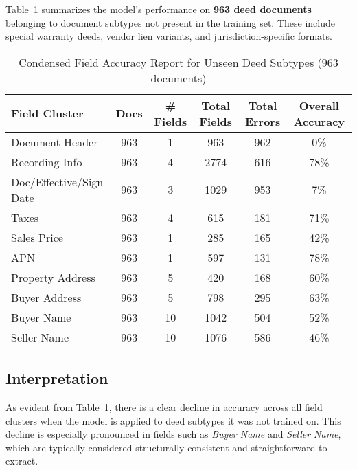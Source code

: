 \documentclass{article}
\begin{document}
Table~\ref{tab:out_of_domain_accuracy} summarizes the model’s performance on \textbf{963 deed documents} belonging to document subtypes not present in the training set. These include special warranty deeds, vendor lien variants, and jurisdiction-specific formats.

\vspace{2mm}

\begin{table}[H]
\centering
\footnotesize
\renewcommand{\arraystretch}{1.2}
\begin{tabular}{|l|c|c|c|c|c|}
\hline
\textbf{Field Cluster} & \textbf{Docs} & \textbf{\# Fields} & \textbf{Total Fields} & \textbf{Total Errors} & \textbf{Overall Accuracy} \\
\hline
Document Header             & 963 & 1  & 963  & 962  & 0\% \\
Recording Info              & 963 & 4  & 2774 & 616  & 78\% \\
Doc/Effective/Sign Date     & 963 & 3  & 1029 & 953  & 7\% \\
Taxes                       & 963 & 4  & 615  & 181  & 71\% \\
Sales Price                 & 963 & 1  & 285  & 165  & 42\% \\
APN                         & 963 & 1  & 597  & 131  & 78\% \\
Property Address            & 963 & 5  & 420  & 168  & 60\% \\
Buyer Address               & 963 & 5  & 798  & 295  & 63\% \\
Buyer Name                  & 963 & 10 & 1042 & 504  & 52\% \\
Seller Name                 & 963 & 10 & 1076 & 586  & 46\% \\

\hline
\end{tabular}
\caption{Condensed Field Accuracy Report for Unseen Deed Subtypes (963 documents)}
\label{tab:out_of_domain_accuracy}
\end{table}

\subsection{Interpretation}

As evident from Table~\ref{tab:out_of_domain_accuracy}, there is a clear decline in accuracy across all field clusters when the model is applied to deed subtypes it was not trained on. This decline is especially pronounced in fields such as \textit{Buyer Name} and \textit{Seller Name}, which are typically considered structurally consistent and straightforward to extract.  \\
\end{document}
